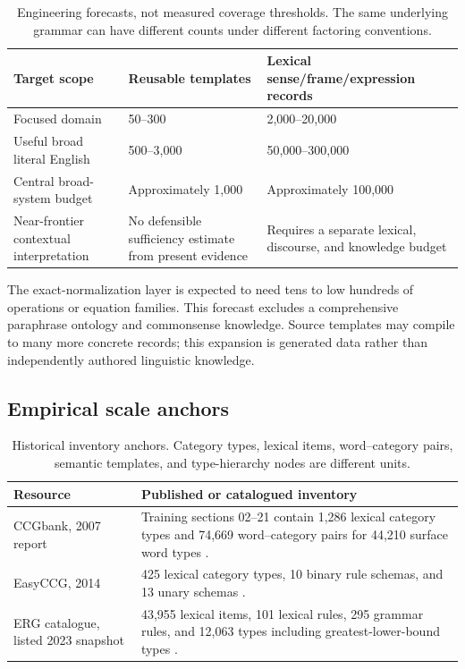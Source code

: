 \documentclass[11pt,a4paper]{article}
\begin{document}
\begin{table}[htbp]
\small
\begin{tabularx}{\textwidth}{L{34mm}YY}
\toprule
Target scope & Reusable templates & Lexical sense/frame/expression records \\
\midrule
Focused domain & 50--300 & 2,000--20,000 \\
Useful broad literal English & 500--3,000 & 50,000--300,000 \\
Central broad-system budget & Approximately 1,000 & Approximately 100,000 \\
Near-frontier contextual interpretation & No defensible sufficiency estimate
from present evidence & Requires a separate lexical, discourse, and knowledge
budget \\
\bottomrule
\end{tabularx}
\caption{Engineering forecasts, not measured coverage thresholds. The
same underlying grammar can have different counts under different factoring
conventions.}
\end{table}

The exact-normalization layer is expected to need tens to low hundreds of
operations or equation families. This forecast excludes a comprehensive
paraphrase ontology and commonsense knowledge. Source templates may compile
to many more concrete records; this expansion is generated data rather than
independently authored linguistic knowledge.

\subsection{Empirical scale anchors}
\begin{table}[htbp]
\small
\begin{tabularx}{\textwidth}{L{31mm}Y}
\toprule
Resource & Published or catalogued inventory \\
\midrule
CCGbank, 2007 report &
Training sections 02--21 contain 1,286 lexical category types and 74,669
word--category pairs for 44,210 surface word types \cite{ccgbank}. \\
EasyCCG, 2014 &
425 lexical category types, 10 binary rule schemas, and 13 unary schemas
\cite{easyccg}. \\
ERG catalogue, listed 2023 snapshot &
43,955 lexical items, 101 lexical rules, 295 grammar rules, and 12,063 types
including greatest-lower-bound types \cite{ergcatalogue}. \\
\bottomrule
\end{tabularx}
\caption{Historical inventory anchors. Category types, lexical items,
word--category pairs, semantic templates, and type-hierarchy nodes are
different units.}
\end{table}
\end{document}
